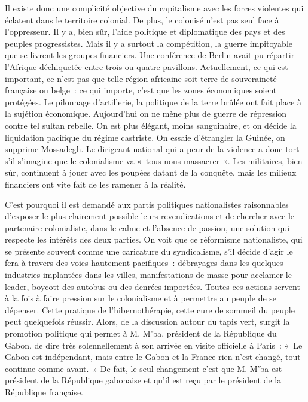 \documentclass[french,twoside]{book} %
\begin{document}
Il existe donc une complicité objective du capitalisme avec les forces violentes qui éclatent dans le territoire colonial. De plus, le colonisé n’est pas seul face à l’oppresseur. Il y a, bien sûr, l’aide politique et diplomatique des pays et des peuples progressistes. Mais il y a surtout la compétition, la guerre impitoyable que se livrent les groupes financiers. Une conférence de Berlin avait pu répartir l’Afrique déchiquetée entre trois ou quatre pavillons. Actuellement, ce qui est important, ce n’est pas que telle région africaine soit terre de souveraineté française ou belge : ce qui importe, c’est que les zones économiques soient protégées. Le pilonnage d’artillerie, la politique de la terre brûlée ont fait place à la sujétion économique. Aujourd’hui on ne mène plus de guerre de répression contre tel sultan rebelle. On est plus élégant, moins sanguinaire, et on décide la liquidation pacifique du régime castriste. On essaie d’étrangler la Guinée, on supprime Mossadegh. Le dirigeant national qui a peur de la violence a donc tort s’il s’imagine que le colonialisme va « tous nous massacrer ». Les militaires, bien sûr, continuent à jouer avec les poupées datant de la conquête, mais les milieux financiers ont vite fait de les ramener à la réalité.\par
 C’est pourquoi il est demandé aux partis politiques nationalistes raisonnables d’exposer le plus clairement possible leurs revendications et de chercher avec le partenaire colonialiste, dans le calme et l’absence de passion, une solution qui respecte les intérêts des deux parties. On voit que ce réformisme nationaliste, qui se présente souvent comme une caricature du syndicalisme, s’il décide d’agir le fera à travers des voies hautement pacifiques : débrayages dans les quelques industries implantées dans les villes, manifestations de masse pour acclamer le leader, boycott des autobus ou des denrées importées. Toutes ces actions servent à la fois à faire pression sur le colonialisme et à permettre au peuple de se dépenser. Cette pratique de l’hibernothérapie, cette cure de sommeil du peuple peut quelquefois réussir. Alors, de la discussion autour du tapis vert, surgit la promotion politique qui permet à M. M’ba, président de la République du Gabon, de dire très solennellement à son arrivée en visite officielle à Paris : « Le Gabon est indépendant, mais entre le Gabon et la France rien n’est changé, tout continue comme avant. » De fait, le seul changement c’est que M. M’ba est président de la République gabonaise et qu’il est reçu par le président de la République française.\par
\end{document}
